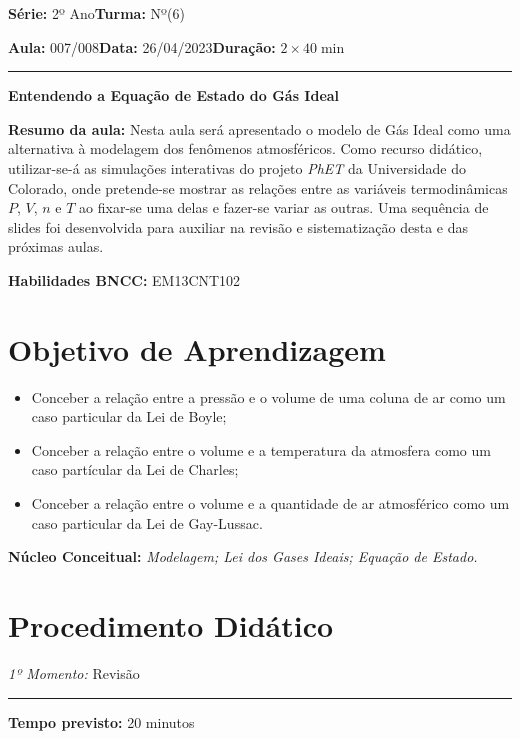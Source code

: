 \documentclass[
12pt,				%
openright,			%
oneside,			%
a4paper,			%
chapter=TITLE,		%
english,			%
brazil				%
]{abntex2}
\begin{document}
\par\noindent\textbf{Série:} 2º Ano\hfill{}\textbf{Turma:} Nº(6)
\par\noindent\textbf{Aula:} 007/008\hfill{}\textbf{Data:} 26/04/2023\hfill{}\textbf{Duração:} $2\times 40\min$
\rule{\textwidth}{.5pt}
\bigskip{}  
\noindent
\begin{center}
	\textbf{Entendendo a Equação de Estado do Gás Ideal}
\end{center}
\par\noindent\textbf{Resumo da aula:} Nesta aula será apresentado o modelo de Gás Ideal como uma alternativa à modelagem dos fenômenos atmosféricos. Como recurso didático, utilizar-se-á as simulações interativas do projeto \textit{PhET} da Universidade do Colorado, onde pretende-se mostrar as relações entre as variáveis termodinâmicas $P$, $V$, $n$ e $T$ ao fixar-se uma delas e fazer-se variar as outras. Uma sequência de slides foi desenvolvida para auxiliar na revisão e sistematização desta e das próximas aulas.
\par\noindent\textbf{Habilidades BNCC:} EM13CNT102

\section{Objetivo de Aprendizagem}
\begin{itemize}
	\item Conceber a relação entre a pressão e o volume de uma coluna de ar como um caso particular da Lei de Boyle;
	\item Conceber a relação entre o volume e a temperatura da atmosfera como um caso partícular da Lei de Charles;
	\item Conceber a relação entre o volume e a quantidade de ar atmosférico como um caso particular da Lei de Gay-Lussac.
\end{itemize}

\medskip{}

\noindent\textbf{Núcleo Conceitual:} \emph{Modelagem; Lei dos Gases Ideais; Equação de Estado.}
\newpage

\section{Procedimento Didático} 
\par\noindent\emph{1º Momento:} Revisão
\par\noindent\rule{.3\textwidth}{.5pt}  
\par\noindent\textbf{Tempo previsto:} 20 minutos
\end{document}
